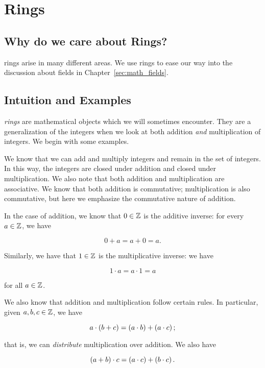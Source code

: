 \section{Rings}
\label{sec:math_rings}

\subsection{Why do we care about Rings?}
\Glspl{ring} arise in many different areas.
We use \glspl{ring} to ease our way into the discussion about
\glspl{field} in Chapter~\ref{sec:math_fields}.

\subsection{Intuition and Examples}
\emph{\Glspl{ring}} are mathematical objects which we will sometimes encounter.
They are a generalization of the integers when we look
at both addition \emph{and} multiplication of integers.
We begin with some examples.

\begin{example}
We know that we can add and multiply integers and remain
in the set of integers.
In this way, the integers are closed under addition
and closed under multiplication.
We also note that both addition and multiplication are \gls{associative}.
We know that both addition is \gls{commutative};
multiplication is also \gls{commutative},
but here we emphasize the \gls{commutative} nature of addition.

In the case of addition, we know that $0\in\mathbb{Z}$ is the additive inverse:
for every $a\in\mathbb{Z}$, we have

\begin{equation}
    0 + a = a + 0 = a.
\end{equation}

\noindent
Similarly, we have that $1\in\mathbb{Z}$ is the multiplicative inverse:
we have

\begin{equation}
    1\cdot a = a\cdot1 = a
\end{equation}

\noindent
for all $a\in\mathbb{Z}$.

We also know that addition and multiplication follow certain rules.
In particular, given $a,b,c\in\mathbb{Z}$, we have

\begin{equation}
    a\cdot\left( b+c \right) = \left( a\cdot b \right) + \left( a\cdot c \right);
\end{equation}

\noindent
that is, we can \emph{distribute} multiplication over addition.
We also have

\begin{equation}
    \left( a+b \right)\cdot c = \left( a\cdot c \right) + \left( b\cdot c \right).
\end{equation}
\end{example}

